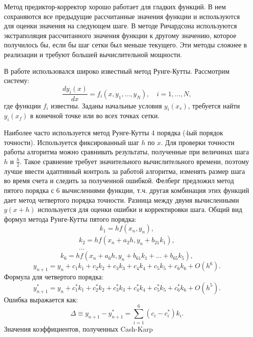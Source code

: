 Метод предиктор-корректор хорошо работает для гладких функций. В нем сохраняются все предыдущие рассчитанные значения функции и используются для оценки значения на следующем шаге. В методе Ричардсона используются экстраполяция рассчитанного значения функции к другому значению, которое получилось бы, если бы шаг сетки был меньше текущего. Эти методы сложнее в реализации и требуют большей вычислительной мощности.

В работе использовался широко известный метод Рунге-Кутты. Рассмотрим систему:
%
\begin{equation}
\frac{dy_i(x)}{dx}=f_i(x,y_1,\dots,y_N),\quad i=1,\dots,N,
\end{equation}
%
где функции $f_i$ известны. Заданы начальные условия $y_i(x_s)$, требуется найти $y_i(x_f)$ в конечной точке или во всех точках сетки.

Наиболее часто используется метод Рунге-Кутты 4 порядка (4ый порядок точности). Используется фиксированный шаг $h$ по $x$. Для проверки точности работы алгоритма можно сравнивать результаты, полученные при величинах шага $h$ и $\frac{h}{2}$. Такое сравнение требует значительного вычислительного времени, поэтому лучше ввести адаптивный контроль за работой алгоритма, изменять размер шага во время счета и следить за полученной ошибкой. Фелберг \cite{Press2002} предложил метод пятого порядка с 6 вычислениями функции, т.ч. другая комбинация этих функций дает метод четвертого порядка точности. Разница между двумя вычисленными $y(x+h)$ используется для оценки ошибки и корректировки шага. Общий вид формул метода Рунге-Кутты пятого порядка:
\begin{equation}
k_1=hf(x_n,y_n),
\end{equation}
\begin{equation}
\begin{split}
k_2=hf(x_n+a_2h,y_n+b_{21}k_1),\\
\dots
\end{split}
\end{equation}
\begin{equation}
k_6=hf(x_n+a_6h,y_n+b_{61}k_1+\dots+b_{65}k_5),
\end{equation}
\begin{equation}
y_{n+1}=y_n+c_1k_1+c_2k_2+c_3k_3+c_4k_4+c_5k_5+c_6k_6+O(h^6).
\end{equation}
Формула для четвертого порядка:
\begin{equation}
y_{n+1}^*=y_n+c_1^*k_1+c_2^*k_2+c_3^*k_3+c_4^*k_4+c_5^*k_5+c_6^*k_6+O(h^5).
\end{equation}
Ошибка выражается как:
\begin{equation}
\Delta\equiv y_{n+1}-y_{n+1}^*=\sum_{i=1}^6(c_i-c_i^*)k_i.
\end{equation}
Значения коэффициентов, полученных Cash-Karp \cite{Press2002}

